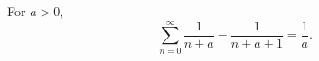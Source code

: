 \documentclass{article}
\begin{document}
For $a>0$,
\begin{equation}
\sum_{n=0}^{\infty} \frac{1}{n+a} - \frac{1}{n+a+1} = \frac{1}{a} .
\label{eq:t}
\end{equation}
\end{document}
